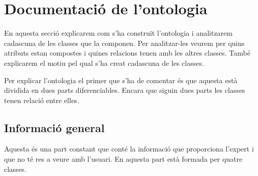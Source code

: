 \documentclass[11pt,a4paper]{article}
\begin{document}
\clearpage


\section{Documentació de l'ontologia}%
\label{sec:ontologia}
En aquesta secció explicarem com s'ha construït l'ontologia i analitzarem cadascuna de les classes que la componen. Per analitzar-les veurem per quins atributs estan compostes i quines relacions tenen amb les altres classes. També explicarem el motiu pel qual s'ha creat cadascuna de les classes.

Per explicar l'ontologia el primer que s'ha de comentar és que aquesta està dividida en dues parts diferenciables. Encara que siguin dues parts les classes tenen relació entre elles.

\subsection{Informació general}
Aquesta és una part constant que conté la informació que proporciona l'expert i que no té res a veure amb l'usuari. En aquesta part està formada per quatre classes.
\end{document}
